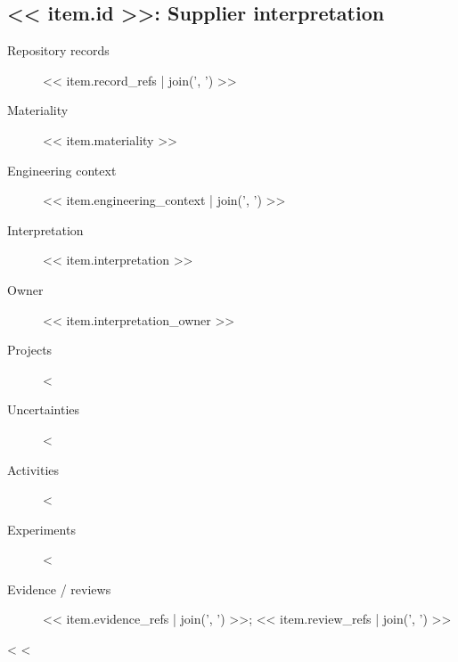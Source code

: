 \documentclass[11pt]{article}
\begin{document}
\subsection{<< item.id >>: Supplier interpretation}
\begin{description}
\item[Repository records] << item.record_refs | join(', ') >>
\item[Materiality] << item.materiality >>
\item[Engineering context] << item.engineering_context | join(', ') >>
\item[Interpretation] << item.interpretation >>
\item[Owner] << item.interpretation_owner >>
\item[Projects] <%
\item[Uncertainties] <%
\item[Activities] <%
\item[Experiments] <%
\item[Evidence / reviews] << item.evidence_refs | join(', ') >>; << item.review_refs | join(', ') >>
\end{description}
<%
<%
\end{document}
